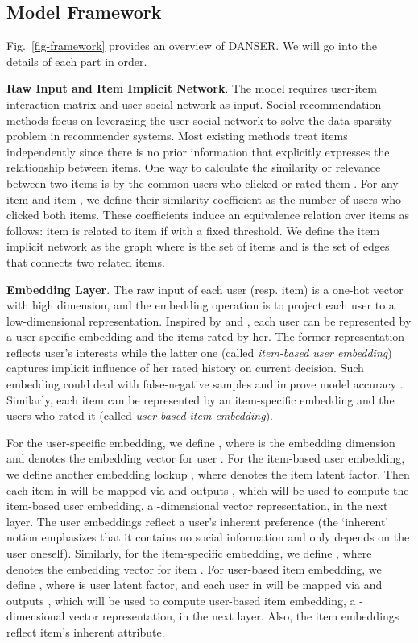 \documentclass[sigconf]{acmart}
\begin{document}
\subsection{Model Framework}

Fig.~\ref{fig-framework} provides an overview of DANSER.
We will go into the details of each part in order.

\textbf{Raw Input and Item Implicit Network}. 
The model requires user-item interaction matrix  and user social network  as input. 
Social recommendation methods focus on leveraging the user social network to solve the data sparsity problem in recommender systems. 
Most existing methods treat items independently since there is no prior information that explicitly expresses the relationship between items. 
One way to calculate the similarity or relevance between two items is by the common users who clicked or rated them \cite{item-based}. 
For any item  and item , we define their similarity coefficient  as the number of users who clicked both items.  
These coefficients induce an equivalence relation over items as follows: item  is related to item  if  with  a fixed threshold.
We define the item implicit network as the graph  where  is the set of items and  is the set of edges that connects two related items. 


\textbf{Embedding Layer}. {The raw input of each user (resp. item) is a one-hot vector with high dimension, and the embedding operation is to project each user to a low-dimensional representation.} Inspired by \cite{SVD++} and \cite{DELF}, each user can be represented by a user-specific embedding and the items rated by her. The former representation reflects user's interests while the latter one (called \textit{item-based user embedding}) captures implicit influence of her rated history on current decision. Such embedding could deal with false-negative samples and improve model accuracy \cite{SVD++}. 
Similarly, each item can be represented by an item-specific embedding and the users who rated it (called \textit{user-based item embedding}).

For the user-specific embedding, we define , where  is the embedding dimension and  denotes the embedding vector for user . For the item-based user embedding, we define another embedding lookup , where  denotes the item latent factor. Then each item in  will be mapped via  and outputs , which will be used to compute the item-based user embedding, a -dimensional vector representation, in the next layer. The user embeddings reflect a user's inherent preference (the `inherent' notion emphasizes that it contains no social information and only depends on the user oneself). 
Similarly, for the item-specific embedding, we define , where  denotes the embedding vector for item . For user-based item embedding, we define , where  is user latent factor, and each user in  will be mapped via  and outputs , which will be used to compute user-based item embedding, a -dimensional vector representation, in the next layer. Also, the item embeddings reflect item's inherent attribute. 
\end{document}
